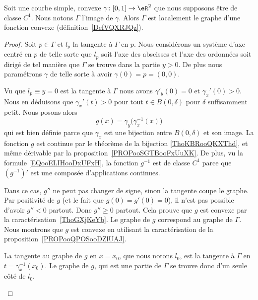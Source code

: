\begin{lemma}        \label{LEMooGEVEooHxPTMO}
	Soit une courbe simple, convexe \( \gamma\colon \mathopen[ 0 , 1 \mathclose]\to \eR^2\) que nous supposons être de classe \( C^1\). Nous notons \( \Gamma\) l'image de \( \gamma\). Alors \( \Gamma\) est localement le graphe d'une fonction convexe (définition~\ref{DefVQXRJQz}).
\end{lemma}

\begin{proof}
	Soit \( p\in \Gamma\) et \( l_p\) la tangente à \( \Gamma\) en \( p\). Nous considérons un système d'axe centré en \( p\) de telle sorte que \( l_p\) soit l'axe des abscisses et l'axe des ordonnées soit dirigé de tel manière que \( \Gamma\) se trouve dans la partie \( y>0\). De plus nous paramétrons \( \gamma\) de telle sorte à avoir \( \gamma(0)=p=(0,0)\).

	Vu que \( l_p\equiv y=0\) est la tangente à \( \Gamma\) nous avons \( \gamma'_y(0)=0\) et \( \gamma_x'(0)>0\). Nous en déduisons que \( \gamma_x'(t)>0\) pour tout \( t\in B(0,\delta)\) pour \( \delta\) suffisamment petit. Nous posons alors
	\begin{equation}
		g(x)=\gamma_y\big( \gamma_x^{-1}(x) \big)
	\end{equation}
	qui est bien définie parce que \( \gamma_x\) est une bijection entre \( B(0,\delta)\) et son image. La fonction \( g\) est continue par le théorème de la bijection \ref{ThoKBRooQKXThd}, et même dérivable par la proposition~\ref{PROPooSGTBooFxUuXK}. De plus, vu la formule \eqref{EQooELIHooDxUFxH}, la fonction \( g^{-1}\) est de classe \( C^1\) parce que \( (g^{-1})'\) est une composée d'applications continues.

	\begin{subproof}
		\spitem[Si \( g\) est \( C^2\)]
		Dans ce cas, \( g''\) ne peut pas changer de signe, sinon la tangente coupe le graphe. Par positivité de \( g\) (et le fait que \( g(0)=g'(0)=0\)), il n'est pas possible d'avoir \( g''<0\) partout. Donc \( g''\geq 0\) partout. Cela prouve que \( g\) est convexe par la caractérisation~\ref{ThoGXjKeYb}.
		Le graphe de \( g\) correspond au graphe de \( \Gamma\). Nous montrons que \( g\) est convexe en utilisant la caractérisation de la proposition~\ref{PROPooQPOSooDZlUAJ}.

		La tangente au graphe de \( g\) en \( x=x_0\), que nous notons \( l_0\), est la tangente à \( \Gamma\) en \( t=\gamma_x^{-1}(x_0)\). Le graphe de \( g\), qui est une partie de \( \Gamma\) se trouve donc d'un seule côté de \(l_0\).


\end{subproof}
\end{proof}
